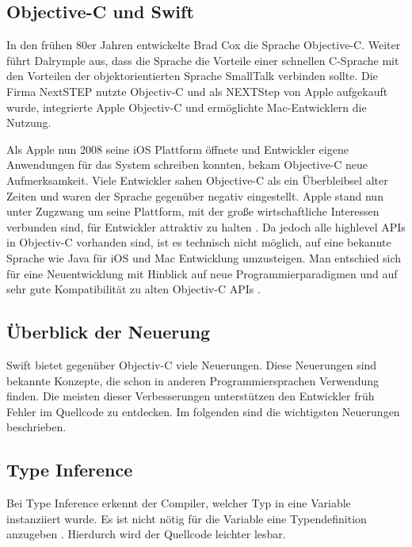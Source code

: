 \subsection{Objective-C und Swift}
In den frühen 80er Jahren entwickelte Brad Cox die Sprache Objective-C\cite{Dalrymple:2009aa}. Weiter führt Dalrymple aus, dass die Sprache  die Vorteile einer schnellen C-Sprache mit den Vorteilen der objektorientierten Sprache SmallTalk verbinden sollte. Die Firma NextSTEP nutzte Objectiv-C und als NEXTStep von Apple aufgekauft wurde, integrierte Apple Objectiv-C und ermöglichte Mac-Entwicklern die Nutzung.

 Als Apple nun 2008 seine iOS Plattform öffnete und Entwickler eigene Anwendungen für das System schreiben konnten, bekam Objective-C neue Aufmerksamkeit. Viele Entwickler sahen Objective-C als ein Überbleibsel alter Zeiten und waren der Sprache gegenüber negativ eingestellt. Apple stand nun unter Zugzwang um seine Plattform, mit der große wirtschaftliche Interessen verbunden sind, für Entwickler attraktiv zu halten \cite{Wells:2015fu}. Da jedoch alle highlevel APIs in Objectiv-C vorhanden sind, ist es technisch nicht möglich, auf eine bekannte Sprache wie Java für iOS und Mac Entwicklung umzusteigen. Man entschied sich für eine Neuentwicklung mit Hinblick auf neue Programmierparadigmen und auf sehr gute Kompatibilität zu alten Objectiv-C APIs \cite{Wells:2015fu}.

\subsection{Überblick der Neuerung}
Swift bietet gegenüber Objectiv-C viele Neuerungen. Diese Neuerungen sind bekannte Konzepte, die schon in anderen Programmiersprachen Verwendung finden. Die meisten dieser Verbesserungen unterstützen den Entwickler früh Fehler im Quellcode zu entdecken. Im folgenden sind die wichtigsten Neuerungen beschrieben.

\subsection*{Type Inference}
Bei Type Inference erkennt der Compiler, welcher Typ in eine Variable instanziiert wurde. Es ist nicht nötig für die Variable eine Typendefinition anzugeben \cite{Apple:2014sp}. Hierdurch wird der Quellcode leichter lesbar. 



